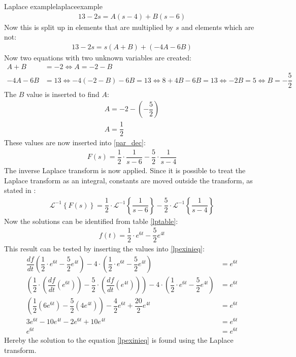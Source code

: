 \begin{example}{Laplace example}{laplaceexample}
\begin{align*}
13-2s = A(s-4) + B(s-6)
\end{align*}
Now this is split up in elements that are multiplied by $s$ and elements which are not:
\begin{align*}
13-2s = s(A+B)+(-4A-6B)
\end{align*}
Now two equations with two unknown variables are created:
\begin{align*}
A+B &=-2 \Leftrightarrow A=-2-B \\
-4A-6B &=13 \Leftrightarrow -4(-2-B)-6B = 13 \Leftrightarrow 8 + 4B - 6B = 13 \Leftrightarrow -2B = 5 \Leftrightarrow B = -\dfrac{5}{2}
\end{align*}
The $B$ value is inserted to find $A$:
\begin{align*}
A=-2- \left(-\dfrac{5}{2} \right) \\
A=\dfrac{1}{2}
\end{align*}
These values are now inserted into \eqref{par_dec}:
\begin{align*}
F(s) = \dfrac{1}{2} \cdot \dfrac{1}{s-6} - \dfrac{5}{2} \cdot \dfrac{1}{s-4}
\end{align*}
The inverse Laplace transform is now applied. Since it is possible to treat the Laplace transform as an integral, constants are moved outside the transform, as stated in :
\begin{align*}
\mathcal{L}^{-1} \left\{F(s) \right\} = \dfrac{1}{2} \cdot \mathcal{L}^{-1} \left\{\dfrac{1}{s-6} \right\} - \dfrac{5}{2} \cdot \mathcal{L}^{-1} \left\{\dfrac{1}{s-4} \right\}
\end{align*}
Now the solutions can be identified from table \ref{lptable}:
\begin{align*}
f(t) = \dfrac{1}{2} \cdot e^{6t} - \dfrac{5}{2}e^{4t}
\end{align*}
This result can be tested by inserting the values into \eqref{lpexinieq}:
\begin{align*}
\dfrac{df}{dt} \left(\dfrac{1}{2} \cdot e^{6t} - \dfrac{5}{2}e^{4t} \right) - 4 \cdot \left(\dfrac{1}{2} \cdot e^{6t} - \dfrac{5}{2}e^{4t} \right) &= e^{6t} \\
\left(\dfrac{1}{2} \cdot \left(\dfrac{df}{dt} \left(e^{6t} \right) \right) - \dfrac{5}{2} \cdot \left(\dfrac{df}{dt} \left(e^{4t} \right) \right) \right) - 4 \cdot \left(\dfrac{1}{2} \cdot e^{6t} - \dfrac{5}{2} e^{4t} \right) &= e^{6t} \\
\left(\dfrac{1}{2} \left(6e^{6t} \right) - \dfrac{5}{2} \left(4e^{4t} \right) \right) - \dfrac{4}{2}e^{6t}+\dfrac{20}{2}e^{4t}&= e^{6t}\\
3e^{6t}-10e^{4t}-2e^{6t}+10e^{4t} &= e^{6t} \\
e^{6t} &= e^{6t}
\end{align*}
Hereby the solution to the equation \eqref{lpexinieq} is found using the Laplace transform.
\end{example}